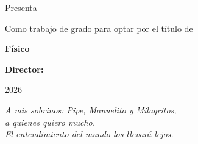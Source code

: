 \AddToShipoutPicture*{\BackgroundPic}
\thispagestyle{empty}
\begin{center}
  \vspace*{0.1cm}
  {\Huge \textbf{\thetitle} \par}
  \vspace{2.5cm}
{Presenta 
\large \par \textbf{\theauthor} \par}
  \vspace*{2cm}
 {Como trabajo de grado para optar por el título de \par \textbf{Físico} \par
 \vspace{1.5cm}
 \large \textbf{Director:} \par \tutor \par}
  \vspace{2.5cm}
  {\Large \universidad \par}
  \vspace{0.5cm}
  {\large \facultad \par}
  \vspace{0.5cm}
  {\large \lugar \par}
  \vspace{0.5cm}
  {\large 2026}
  \vfill
\end{center}

\newpage
\thispagestyle{empty}
\mbox{}

%
\thispagestyle{empty}
\vspace*{0.6\textheight}
\begin{flushright}
    \textit{A mis sobrinos: Pipe, Manuelito y Milagritos,\\
    a quienes quiero mucho.\\
    El entendimiento del mundo los llevará lejos.}
\end{flushright}
\vspace*{\fill}

\newpage







\newpage
\tableofcontents*
\newpage
\listoftables 
\newpage
\listoffigures
\newpage

\newpage


















\appendix


\backmatter 

{\small
\printbibliography[sorting=nyt]
}

\newpage
\printindex
